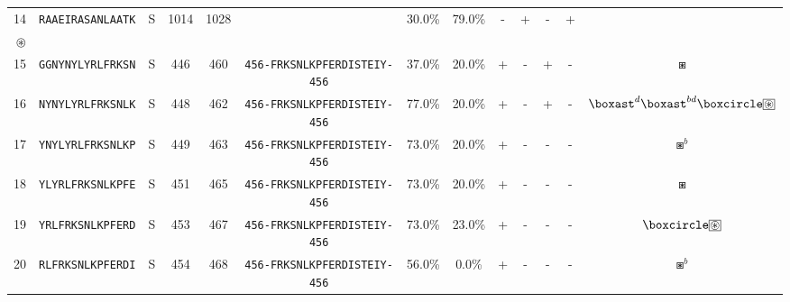 \begin{tabular}{rcccccccccccc}
14 &  \texttt{RAAEIRASANLAATK} &       S &   1014 &  1028 &                                                                  &                          30.0\% &                           79.0\% &          - &           + &          - &           + &                                 \Centerstack{  $\circ \circ^b \circ^d \circ^{bd}$ \\  $\circledast$ } \\
15 &  \texttt{GGNYNYLYRLFRKSN} &       S &    446 &   460 &  \texttt{{\scriptsize 456-}FRKSNLKPFERDISTEIY{\scriptsize -456}} &                          37.0\% &                           20.0\% &          + &           - &          + &           - &                                                                                           $ \boxast $ \\
16 &  \texttt{NYNYLYRLFRKSNLK} &       S &    448 &   462 &  \texttt{{\scriptsize 456-}FRKSNLKPFERDISTEIY{\scriptsize -456}} &                          77.0\% &                           20.0\% &          + &           - &          + &           - &                 $ \boxast^d \boxast^{bd} \boxcircle \setlength{\fboxsep}{0.5pt} \boxed{\circledast} $ \\
17 &  \texttt{YNYLYRLFRKSNLKP} &       S &    449 &   463 &  \texttt{{\scriptsize 456-}FRKSNLKPFERDISTEIY{\scriptsize -456}} &                          73.0\% &                           20.0\% &          + &           - &          - &           - &                                                                                         $ \boxast^b $ \\
18 &  \texttt{YLYRLFRKSNLKPFE} &       S &    451 &   465 &  \texttt{{\scriptsize 456-}FRKSNLKPFERDISTEIY{\scriptsize -456}} &                          73.0\% &                           20.0\% &          + &           - &          - &           - &                                                                                           $ \boxast $ \\
19 &  \texttt{YRLFRKSNLKPFERD} &       S &    453 &   467 &  \texttt{{\scriptsize 456-}FRKSNLKPFERDISTEIY{\scriptsize -456}} &                          73.0\% &                           23.0\% &          + &           - &          - &           - &                                        $ \boxcircle \setlength{\fboxsep}{0.5pt} \boxed{\circledast} $ \\
20 &  \texttt{RLFRKSNLKPFERDI} &       S &    454 &   468 &  \texttt{{\scriptsize 456-}FRKSNLKPFERDISTEIY{\scriptsize -456}} &                          56.0\% &                            0.0\% &          + &           - &          - &           - &                                                                                         $ \boxast^b $ \\

\end{tabular}
